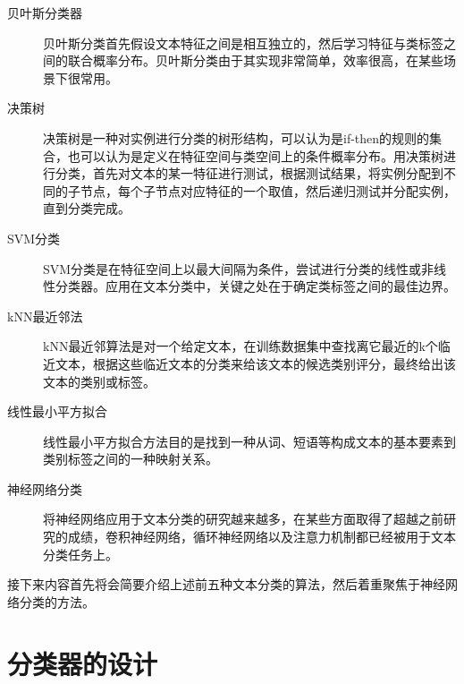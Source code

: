 \documentclass[UTF8]{ctexart}
\begin{document}
	\begin{description}
		\item[贝叶斯分类器]贝叶斯分类首先假设文本特征之间是相互独立的，然后学习特征与类标签之间的联合概率分布。贝叶斯分类由于其实现非常简单，效率很高，在某些场景下很常用。
		\item[决策树]决策树是一种对实例进行分类的树形结构，可以认为是if-then的规则的集合，也可以认为是定义在特征空间与类空间上的条件概率分布。用决策树进行分类，首先对文本的某一特征进行测试，根据测试结果，将实例分配到不同的子节点，每个子节点对应特征的一个取值，然后递归测试并分配实例，直到分类完成。
		\item[SVM分类]SVM分类是在特征空间上以最大间隔为条件，尝试进行分类的线性或非线性分类器。应用在文本分类中，关键之处在于确定类标签之间的最佳边界。
		\item[kNN最近邻法] kNN最近邻算法是对一个给定文本，在训练数据集中查找离它最近的k个临近文本，根据这些临近文本的分类来给该文本的候选类别评分，最终给出该文本的类别或标签。
		\item[线性最小平方拟合] 线性最小平方拟合方法目的是找到一种从词、短语等构成文本的基本要素到类别标签之间的一种映射关系。
		\item[神经网络分类]将神经网络应用于文本分类的研究越来越多，在某些方面取得了超越之前研究的成绩，卷积神经网络，循环神经网络以及注意力机制都已经被用于文本分类任务上。
	\end{description}
	\par 接下来内容首先将会简要介绍上述前五种文本分类的算法，然后着重聚焦于神经网络分类的方法。
	
\section{分类器的设计}
\end{document}
